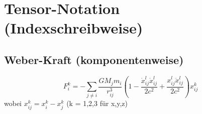 \section{Tensor-Notation (Indexschreibweise)}

\subsection*{Weber-Kraft (komponentenweise)}
\begin{equation}
F_i^k = -\sum_{j\neq i} \frac{GM_j m_i}{r_{ij}^3} \left(
1 - \frac{\dot{x}_{ij}^l \dot{x}_{ij}^l}{2c^2} + \frac{x_{ij}^l \ddot{x}_{ij}^l}{2c^2}
\right) x_{ij}^k
\end{equation}
wobei \( x_{ij}^k = x_i^k - x_j^k \) (k = 1,2,3 für x,y,z)

